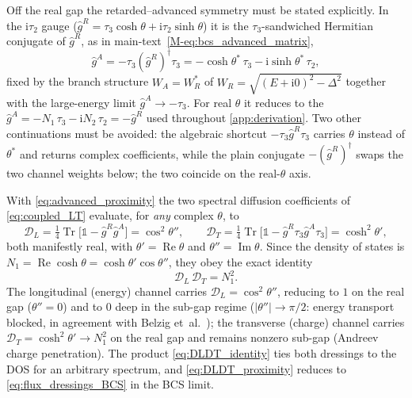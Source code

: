 \documentclass[
  aps,
  prb,
  preprint,
  superscriptaddress,
  longbibliography,
  nofootinbib
]{revtex4-2}
\newcommand{\ii}{\mathrm{i}}
\newcommand{\Tr}{\operatorname{Tr}}
\newcommand{\DOS}{N_1}
\newcommand{\hatg}{\hat{g}}
\providecommand{\openone}{}\renewcommand{\openone}{\mathds{1}}
\newcommand{\Real}{\operatorname{Re}}
\newcommand{\Imag}{\operatorname{Im}}
\begin{document}
Off the real gap the retarded--advanced symmetry must be stated explicitly. In the
\(\ii\tau_2\) gauge (\(\hatg^R=\tau_3\cosh\theta+\ii\tau_2\sinh\theta\)) it is the
\(\tau_3\)-sandwiched Hermitian conjugate of
\(\hatg^R\), as in main-text~\cref{M-eq:bcs_advanced_matrix},
\begin{equation}
  \hatg^A=-\tau_3(\hatg^R)^{\dagger}\tau_3
         =-\cosh\theta^{\ast}\,\tau_3-\ii\sinh\theta^{\ast}\,\tau_2,
  \label{eq:advanced_proximity}
\end{equation}
fixed by the branch structure \(W_A=W_R^{\ast}\) of
\(W_R=\sqrt{(E+\ii0)^{2}-\Delta^{2}}\) together with the large-energy limit
\(\hatg^A\to-\tau_3\). For real \(\theta\) it reduces to the
\(\hatg^A=-\DOS\,\tau_3-\ii N_2\,\tau_2=-\hatg^R\) used throughout
\cref{app:derivation}. Two other continuations must be avoided: the
algebraic shortcut \(-\tau_3\hatg^R\tau_3\) carries \(\theta\) instead of
\(\theta^{\ast}\) and returns complex coefficients, while the plain
conjugate \(-(\hatg^R)^{\dagger}\) swaps the two channel weights below;
the two coincide on the real-\(\theta\) axis.

With \cref{eq:advanced_proximity} the two spectral diffusion coefficients of
\cref{eq:coupled_LT} evaluate, for \emph{any} complex \(\theta\), to
\begin{equation}
  \mathcal D_L=\tfrac14\Tr\!\big[\openone-\hatg^R\hatg^A\big]=\cos^{2}\theta'',
  \qquad
  \mathcal D_T=\tfrac14\Tr\!\big[\openone-\hatg^R\tau_3\hatg^A\tau_3\big]=\cosh^{2}\theta',
  \label{eq:DLDT_proximity}
\end{equation}
both manifestly real, with \(\theta'=\Real\theta\) and \(\theta''=\Imag\theta\).
Since the density of states is
\(\DOS=\Real\cosh\theta=\cosh\theta'\cos\theta''\), they obey the exact identity
\begin{equation}
  \mathcal D_L\,\mathcal D_T=\DOS^{2}.
  \label{eq:DLDT_identity}
\end{equation}
The longitudinal (energy) channel carries \(\mathcal D_L=\cos^{2}\theta''\), reducing to
\(1\) on the real gap (\(\theta''=0\)) and to \(0\) deep in the sub-gap
regime (\(|\theta''|\to\pi/2\): energy transport blocked, in agreement with
Belzig et~al.~\cite{belzig1999}); the transverse (charge) channel
carries \(\mathcal D_T=\cosh^{2}\theta'\to\DOS^{2}\) on the real gap and remains
nonzero sub-gap (Andreev charge penetration). The product
\cref{eq:DLDT_identity} ties both
dressings to the DOS for an arbitrary spectrum, and \cref{eq:DLDT_proximity} reduces
to \cref{eq:flux_dressings_BCS} in the BCS limit.
\end{document}
